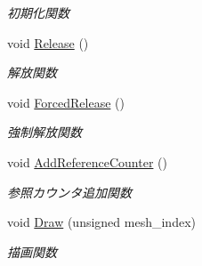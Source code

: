 \begin{DoxyCompactItemize}
\begin{DoxyCompactList}\small\item\em 初期化関数 \end{DoxyCompactList}\item 
void \mbox{\hyperlink{class_md_bin_object_ab73761f64e78f0255baf056288df3ce7}{Release}} ()
\begin{DoxyCompactList}\small\item\em 解放関数 \end{DoxyCompactList}\item 
void \mbox{\hyperlink{class_md_bin_object_a4370e12dd75ed61bf5b2251aa23419e2}{Forced\+Release}} ()
\begin{DoxyCompactList}\small\item\em 強制解放関数 \end{DoxyCompactList}\item 
void \mbox{\hyperlink{class_md_bin_object_a0b4b71f40a5e6f4c83f2f0232187801e}{Add\+Reference\+Counter}} ()
\begin{DoxyCompactList}\small\item\em 参照カウンタ追加関数 \end{DoxyCompactList}\item 
void \mbox{\hyperlink{class_md_bin_object_aa8558240aec4cf691c3e29c480b76683}{Draw}} (unsigned mesh\+\_\+index)
\begin{DoxyCompactList}\small\item\em 描画関数 \end{DoxyCompactList}\end{DoxyCompactItemize}
